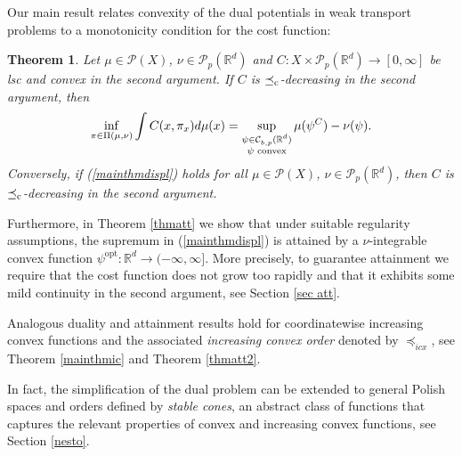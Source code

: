\documentclass[reqno, a4paper]{amsart}
\newcommand{\lc}{\preceq_{\textnormal{c}}}
\newcommand{\ld}{\preceq_{E}}
\newcommand{\lic}{\preceq_{icx}}
\newtheorem{theorem}{Theorem}[section]
\newcommand{\PP}{\mathcal{P}}
\newcommand{\R}{\mathbb R}
\theoremstyle{definition}
\theoremstyle{definition}
\theoremstyle{definition}
\newtheorem{remark}[theorem]{Remark}
\begin{document}
Our main result relates convexity of the dual potentials in weak transport problems to a monotonicity condition for the cost function:
\begin{theorem} \label{mainthm}
    Let $\mu\in\PP(X)$, $\nu \in \PP_p(\R^d)$ and $C:X\times\PP_p(\R^d)\to[0,\infty]$ be lsc and convex in the second argument. If $C$ is $\lc$-decreasing in the second argument, then 
\begin{align} \label{mainthmdispl}
		\inf_{\pi\in\Pi(\mu,\nu)} \int C(x,\pi_x)d\mu(x)= \sup_{\substack{\psi \in  {\mathcal{C}}^{}_{b,p}(\R^d) \\ \psi\textnormal{ convex}}} \mu(\psi^C) - \nu(\psi).
	\end{align}
    Conversely, if (\ref{mainthmdispl}) holds for all $\mu\in\PP(X)$, $\nu\in\PP_p(\R^d)$, then $C$ is $\lc$-decreasing in the second argument.
\end{theorem}

Furthermore, in Theorem \ref{thmatt} we show that under suitable regularity assumptions, the supremum in (\ref{mainthmdispl}) is attained by a $\nu$-integrable convex function $\psi^{\text{opt}}:\R^d\to(-\infty,\infty]$. More precisely, to guarantee attainment we require that the cost function does not grow too rapidly and that it exhibits some mild continuity in the second argument, see Section \ref{sec att}.

Analogous duality and attainment results hold for coordinatewise increasing convex functions and the associated \textit{increasing convex order} denoted by $\lic$, see Theorem \ref{mainthmic} and Theorem \ref{thmatt2}. 

In fact, the simplification of the dual problem can be extended to general Polish spaces and orders defined by \textit{stable cones}, an abstract class of functions that captures the relevant properties of convex and increasing convex functions, see Section \ref{nesto}.







\medskip

\end{document}
